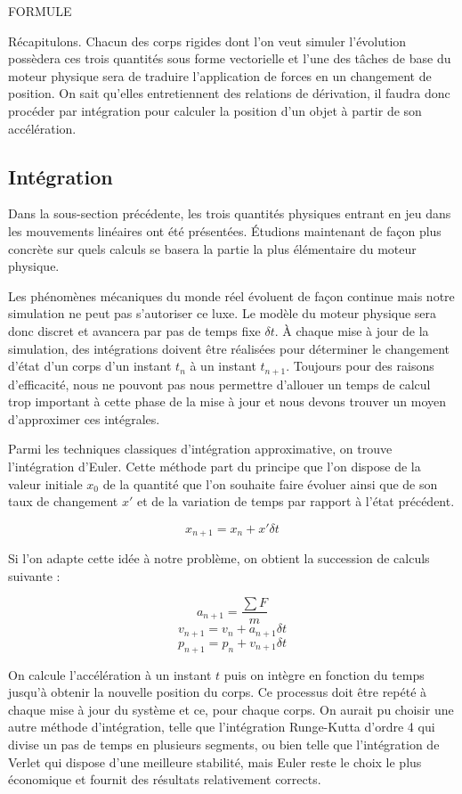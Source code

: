 FORMULE 

Récapitulons. Chacun des corps rigides dont l'on veut simuler l'évolution possèdera ces trois quantités sous forme vectorielle et l'une des tâches de base du moteur physique sera de traduire l'application de forces en un changement de position. On sait qu'elles entretiennent des relations de dérivation, il faudra donc procéder par intégration pour calculer la position d'un objet à partir de son accélération.

\subsection{Intégration}

Dans la sous-section précédente, les trois quantités physiques entrant en jeu dans les mouvements linéaires ont été présentées. \'Etudions maintenant de façon plus concrète sur quels calculs se basera la partie la plus élémentaire du moteur physique.

Les phénomènes mécaniques du monde réel évoluent de façon continue mais notre simulation ne peut pas s'autoriser ce luxe. Le modèle du moteur physique sera donc discret et avancera par pas de temps fixe $\delta t$. \`A chaque mise à jour de la simulation, des intégrations doivent être réalisées pour déterminer le changement d'état d'un corps d'un instant $t_n$ à un instant $t_{n+1}$. Toujours pour des raisons d'efficacité, nous ne pouvont pas nous permettre d'allouer un temps de calcul trop important à cette phase de la mise à jour et nous devons trouver un moyen d'approximer ces intégrales.

Parmi les techniques classiques d'intégration approximative, on trouve l'intégration d'Euler. Cette méthode part du principe que l'on dispose de la valeur initiale $x_0$ de la quantité que l'on souhaite faire évoluer ainsi que de son taux de changement $x'$ et de la variation de temps par rapport à l'état précédent.

\[x_{n+1} = x_{n} + x' \delta t\]

Si l'on adapte cette idée à notre problème, on obtient la succession de calculs suivante :

\[a_{n+1} = \frac{\sum F}{m}\]
\[v_{n+1} = v_n + a_{n+1} \delta t\]
\[p_{n+1} = p_n + v_{n+1} \delta t\]

On calcule l'accélération à un instant $t$ puis on intègre en fonction du temps jusqu'à obtenir la nouvelle position du corps. Ce processus doit être repété à chaque mise à jour du système et ce, pour chaque corps. On aurait pu choisir une autre méthode d'intégration, telle que l'intégration Runge-Kutta d'ordre 4 qui divise un pas de temps en plusieurs segments, ou bien telle que l'intégration de Verlet qui dispose d'une meilleure stabilité, mais Euler reste le choix le plus économique et fournit des résultats relativement corrects.

